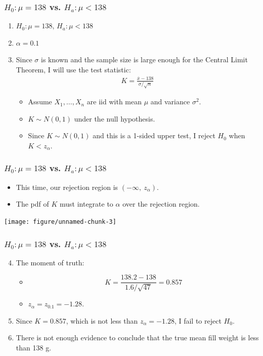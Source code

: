 \documentclass[handout]{beamer}\usepackage{graphicx, color}
\newenvironment{knitrout}{}{} %
\providecommand{\ov}[1]{\overline{#1}}
\numberwithin{equation}{section}
\begin{document}
\begin{frame}
\frametitle{ $H_0: \mu = 138$ vs. $H_a: \mu < 138$} \small
\begin{enumerate}[1. ]
\item  $H_0: \mu = 138$, $H_a: \mu < 138$
\pause \item $\alpha = 0.1$
\pause \item Since $\sigma$ is known and the sample size is large enough for the Central Limit Theorem, I will use the test statistic:
\begin{align*}
K = \frac{\ov{x} - 138}{\sigma/\sqrt{n}}
\end{align*}
\begin{itemize}
\pause \item Assume $X_1, \ldots, X_n$ are iid with mean $\mu$ and variance $\sigma^2$.
\pause \item $K \sim N(0,1)$ under the null hypothesis.
\pause \item Since $K \sim N(0,1)$ and this is a 1-sided upper test, I reject $H_0$ when $K < z_{\alpha}$.
\end{itemize}

\end{enumerate}
\end{frame}


\begin{frame}
\frametitle{ $H_0: \mu = 138$ vs. $H_a: \mu < 138$} \small
\begin{itemize}
\item This time, our rejection region is $(-\infty,\  z_{\alpha})$.
\pause \item The pdf of $K$ must integrate to $\alpha$ over the rejection region.
\end{itemize}
\pause \begin{center}
\begin{knitrout}
\color{fgcolor}
\texttt{[image: figure/unnamed-chunk-3]} 

\end{knitrout}


\end{center}
\end{frame}

\begin{frame}
\frametitle{ $H_0: \mu = 138$ vs. $H_a: \mu < 138$} \small
\begin{enumerate}
\setcounter{enumi}{3}
\item The moment of truth:
\begin{itemize}
\pause \item \[K = \frac{138.2 - 138}{1.6/\sqrt{47}} = 0.857\]
\pause \item $z_{\alpha} = z_{0.1} = -1.28$.
\end{itemize}
\pause \item Since $K = 0.857$, which is not less than $z_\alpha = -1.28$, I fail to reject $H_0$.
\pause \item There is not enough evidence to conclude that the true mean fill weight is less than 138 g.
\end{enumerate}
\end{frame}
\end{document}
